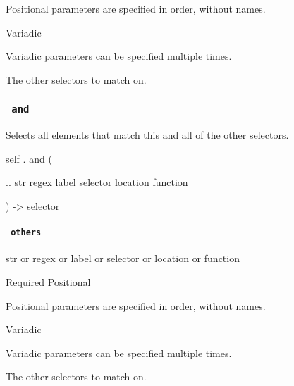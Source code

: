 \label{definitions-or-others-positional-tooltip}
Positional parameters are specified in order, without names.

{{ Variadic }}

\label{definitions-or-others-variadic-tooltip}
Variadic parameters can be specified multiple times.

The other selectors to match on.

\subsubsection{\texorpdfstring{\texttt{\ and\ }}{ and }}\label{definitions-and}

Selects all elements that match this and all of the other selectors.

self { . } { and } (

{ \hyperref[definitions-and-parameters-others]{..}
\href{/docs/reference/foundations/str/}{str}
\href{/docs/reference/foundations/regex/}{regex}
\href{/docs/reference/foundations/label/}{label}
\href{/docs/reference/foundations/selector/}{selector}
\href{/docs/reference/introspection/location/}{location}
\href{/docs/reference/foundations/function/}{function} }

) -\textgreater{} \href{/docs/reference/foundations/selector/}{selector}

\paragraph{\texorpdfstring{\texttt{\ others\ }}{ others }}\label{definitions-and-others}

\href{/docs/reference/foundations/str/}{str} {or}
\href{/docs/reference/foundations/regex/}{regex} {or}
\href{/docs/reference/foundations/label/}{label} {or}
\href{/docs/reference/foundations/selector/}{selector} {or}
\href{/docs/reference/introspection/location/}{location} {or}
\href{/docs/reference/foundations/function/}{function}

{Required} {{ Positional }}

\label{definitions-and-others-positional-tooltip}
Positional parameters are specified in order, without names.

{{ Variadic }}

\label{definitions-and-others-variadic-tooltip}
Variadic parameters can be specified multiple times.

The other selectors to match on.

